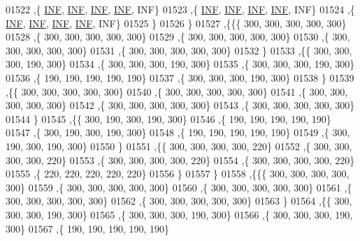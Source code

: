 \begin{DoxyCode}
01522    ,\{   \hyperlink{constants_8h_a12c2040f25d8e3a7b9e1c2024c618cb6}{INF},   \hyperlink{constants_8h_a12c2040f25d8e3a7b9e1c2024c618cb6}{INF},   \hyperlink{constants_8h_a12c2040f25d8e3a7b9e1c2024c618cb6}{INF},   \hyperlink{constants_8h_a12c2040f25d8e3a7b9e1c2024c618cb6}{INF},   INF\}
01523    ,\{   \hyperlink{constants_8h_a12c2040f25d8e3a7b9e1c2024c618cb6}{INF},   \hyperlink{constants_8h_a12c2040f25d8e3a7b9e1c2024c618cb6}{INF},   \hyperlink{constants_8h_a12c2040f25d8e3a7b9e1c2024c618cb6}{INF},   \hyperlink{constants_8h_a12c2040f25d8e3a7b9e1c2024c618cb6}{INF},   INF\}
01524    ,\{   \hyperlink{constants_8h_a12c2040f25d8e3a7b9e1c2024c618cb6}{INF},   \hyperlink{constants_8h_a12c2040f25d8e3a7b9e1c2024c618cb6}{INF},   \hyperlink{constants_8h_a12c2040f25d8e3a7b9e1c2024c618cb6}{INF},   \hyperlink{constants_8h_a12c2040f25d8e3a7b9e1c2024c618cb6}{INF},   INF\}
01525    \}
01526   \}
01527  ,\{\{\{   300,   300,   300,   300,   300\}
01528    ,\{   300,   300,   300,   300,   300\}
01529    ,\{   300,   300,   300,   300,   300\}
01530    ,\{   300,   300,   300,   300,   300\}
01531    ,\{   300,   300,   300,   300,   300\}
01532    \}
01533   ,\{\{   300,   300,   300,   190,   300\}
01534    ,\{   300,   300,   300,   190,   300\}
01535    ,\{   300,   300,   300,   190,   300\}
01536    ,\{   190,   190,   190,   190,   190\}
01537    ,\{   300,   300,   300,   190,   300\}
01538    \}
01539   ,\{\{   300,   300,   300,   300,   300\}
01540    ,\{   300,   300,   300,   300,   300\}
01541    ,\{   300,   300,   300,   300,   300\}
01542    ,\{   300,   300,   300,   300,   300\}
01543    ,\{   300,   300,   300,   300,   300\}
01544    \}
01545   ,\{\{   300,   190,   300,   190,   300\}
01546    ,\{   190,   190,   190,   190,   190\}
01547    ,\{   300,   190,   300,   190,   300\}
01548    ,\{   190,   190,   190,   190,   190\}
01549    ,\{   300,   190,   300,   190,   300\}
01550    \}
01551   ,\{\{   300,   300,   300,   300,   220\}
01552    ,\{   300,   300,   300,   300,   220\}
01553    ,\{   300,   300,   300,   300,   220\}
01554    ,\{   300,   300,   300,   300,   220\}
01555    ,\{   220,   220,   220,   220,   220\}
01556    \}
01557   \}
01558  ,\{\{\{   300,   300,   300,   300,   300\}
01559    ,\{   300,   300,   300,   300,   300\}
01560    ,\{   300,   300,   300,   300,   300\}
01561    ,\{   300,   300,   300,   300,   300\}
01562    ,\{   300,   300,   300,   300,   300\}
01563    \}
01564   ,\{\{   300,   300,   300,   190,   300\}
01565    ,\{   300,   300,   300,   190,   300\}
01566    ,\{   300,   300,   300,   190,   300\}
01567    ,\{   190,   190,   190,   190,   190\}

\end{DoxyCode}
